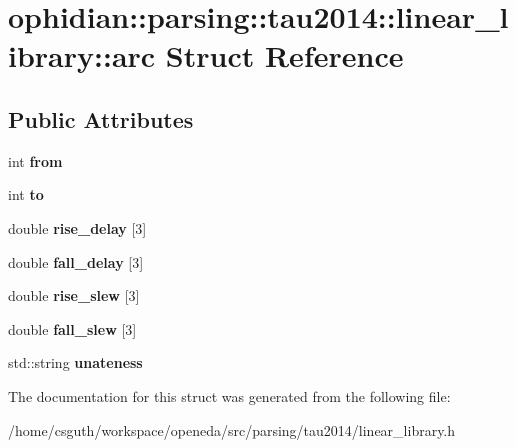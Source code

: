 \hypertarget{structophidian_1_1parsing_1_1tau2014_1_1linear__library_1_1arc}{\section{ophidian\-:\-:parsing\-:\-:tau2014\-:\-:linear\-\_\-library\-:\-:arc Struct Reference}
\label{structophidian_1_1parsing_1_1tau2014_1_1linear__library_1_1arc}
}
\subsection*{Public Attributes}
\begin{DoxyCompactItemize}
\item 
\hypertarget{structophidian_1_1parsing_1_1tau2014_1_1linear__library_1_1arc_a060e97543a992ae9dc772895e04fb5fe}{int {\bfseries from}}\label{structophidian_1_1parsing_1_1tau2014_1_1linear__library_1_1arc_a060e97543a992ae9dc772895e04fb5fe}

\item 
\hypertarget{structophidian_1_1parsing_1_1tau2014_1_1linear__library_1_1arc_a675dc8c47d061aa6a9c69b0dfacb3196}{int {\bfseries to}}\label{structophidian_1_1parsing_1_1tau2014_1_1linear__library_1_1arc_a675dc8c47d061aa6a9c69b0dfacb3196}

\item 
\hypertarget{structophidian_1_1parsing_1_1tau2014_1_1linear__library_1_1arc_afed32796e18b3531f716d7e517185251}{double {\bfseries rise\-\_\-delay} \mbox{[}3\mbox{]}}\label{structophidian_1_1parsing_1_1tau2014_1_1linear__library_1_1arc_afed32796e18b3531f716d7e517185251}

\item 
\hypertarget{structophidian_1_1parsing_1_1tau2014_1_1linear__library_1_1arc_ae3437d853f0830cdb9c7dcc23d19b0f4}{double {\bfseries fall\-\_\-delay} \mbox{[}3\mbox{]}}\label{structophidian_1_1parsing_1_1tau2014_1_1linear__library_1_1arc_ae3437d853f0830cdb9c7dcc23d19b0f4}

\item 
\hypertarget{structophidian_1_1parsing_1_1tau2014_1_1linear__library_1_1arc_aa23c5ae77463b7fa6323f8abce0676c8}{double {\bfseries rise\-\_\-slew} \mbox{[}3\mbox{]}}\label{structophidian_1_1parsing_1_1tau2014_1_1linear__library_1_1arc_aa23c5ae77463b7fa6323f8abce0676c8}

\item 
\hypertarget{structophidian_1_1parsing_1_1tau2014_1_1linear__library_1_1arc_ab3dc1cca1b845f364f7c3c97cae91aa4}{double {\bfseries fall\-\_\-slew} \mbox{[}3\mbox{]}}\label{structophidian_1_1parsing_1_1tau2014_1_1linear__library_1_1arc_ab3dc1cca1b845f364f7c3c97cae91aa4}

\item 
\hypertarget{structophidian_1_1parsing_1_1tau2014_1_1linear__library_1_1arc_ad5c0c70904b359e61e0f46209b617a8c}{std\-::string {\bfseries unateness}}\label{structophidian_1_1parsing_1_1tau2014_1_1linear__library_1_1arc_ad5c0c70904b359e61e0f46209b617a8c}

\end{DoxyCompactItemize}


The documentation for this struct was generated from the following file\-:\begin{DoxyCompactItemize}
\item 
/home/csguth/workspace/openeda/src/parsing/tau2014/linear\-\_\-library.\-h\end{DoxyCompactItemize}
